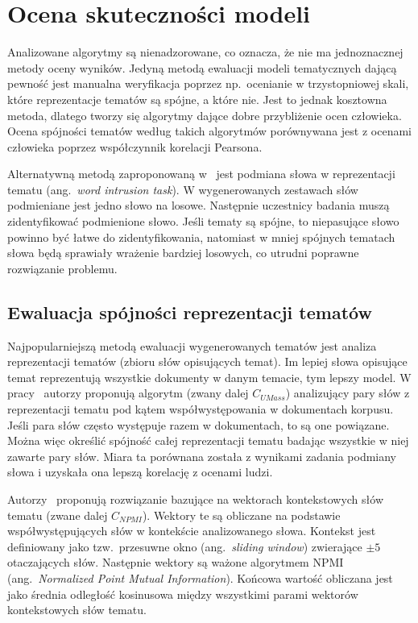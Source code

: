 
\chapter{Ocena skuteczności modeli}
	Analizowane algorytmy są nienadzorowane, co oznacza, że nie ma jednoznacznej metody oceny wyników.
	Jedyną metodą ewaluacji modeli tematycznych dającą pewność jest manualna weryfikacja poprzez np.\ ocenianie w trzystopniowej skali,
		które reprezentacje tematów są spójne, a które nie.
	Jest to jednak kosztowna metoda, dlatego tworzy się algorytmy dające dobre przybliżenie ocen człowieka.
	Ocena spójności tematów według takich algorytmów porównywana jest z ocenami człowieka poprzez współczynnik korelacji Pearsona.

	Alternatywną metodą zaproponowaną w~\cite{Word_intrusion} jest podmiana słowa w reprezentacji tematu (ang.\ \emph{word intrusion task}).
	W wygenerowanych zestawach słów podmieniane jest jedno słowo na losowe.
	Następnie uczestnicy badania muszą zidentyfikować podmienione słowo.
	Jeśli tematy są spójne, to niepasujące słowo powinno być łatwe do zidentyfikowania,
		natomiast w mniej spójnych tematach słowa będą sprawiały wrażenie bardziej losowych, co utrudni poprawne rozwiązanie problemu.

\section{Ewaluacja spójności reprezentacji tematów}\label{sec:coherence_scores}
	Najpopularniejszą metodą ewaluacji wygenerowanych tematów jest analiza reprezentacji tematów (zbioru słów opisujących temat).
	Im lepiej słowa opisujące temat reprezentują wszystkie dokumenty w danym temacie, tym lepszy model.
	W pracy~\cite{U_MASS} autorzy proponują algorytm (zwany dalej \(C_{UMass}\))
		analizujący pary słów z reprezentacji tematu pod kątem współwystępowania w dokumentach korpusu.
	Jeśli para słów często występuje razem w dokumentach, to są one powiązane.
	Można więc określić spójność całej reprezentacji tematu badając wszystkie w niej zawarte pary słów.
	Miara ta porównana została z wynikami zadania podmiany słowa i uzyskała ona lepszą korelację z ocenami ludzi.

	Autorzy~\cite{C_NPMI} proponują rozwiązanie bazujące na wektorach kontekstowych słów tematu (zwane dalej \(C_{NPMI}\)).
	Wektory te są obliczane na podstawie współwystępujących słów w kontekście analizowanego słowa.
	Kontekst jest definiowany jako tzw.\ przesuwne okno (ang.\ \emph{sliding window}) zwierające \(\pm 5\) otaczających słów.
	Następnie wektory są ważone algorytmem NPMI (ang.\ \emph{Normalized Point Mutual Information}).
	Końcowa wartość obliczana jest jako średnia odległość kosinusowa między wszystkimi parami wektorów kontekstowych słów tematu.

